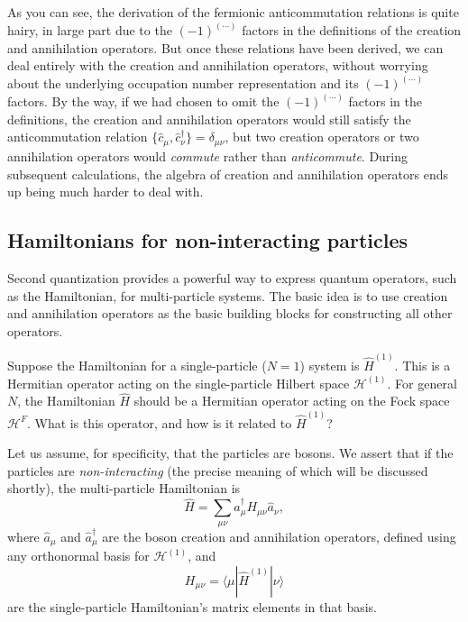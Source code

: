 \documentclass[prx,12pt]{revtex4-2}
\begin{document}
As you can see, the derivation of the fermionic anticommutation
relations is quite hairy, in large part due to the $(-1)^{(\cdots)}$
factors in the definitions of the creation and annihilation operators.
But once these relations have been derived, we can deal entirely with
the creation and annihilation operators, without worrying about the
underlying occupation number representation and its $(-1)^{(\cdots)}$
factors.  By the way, if we had chosen to omit the $(-1)^{(\cdots)}$
factors in the definitions, the creation and annihilation operators
would still satisfy the anticommutation relation
$\{\hat{c}_\mu,\hat{c}_\nu^\dagger\}=\delta_{\mu\nu}$, but two
creation operators or two annihilation operators would
\textit{commute} rather than \textit{anticommute}.  During subsequent
calculations, the algebra of creation and annihilation operators ends
up being much harder to deal with.

\subsection{Hamiltonians for non-interacting particles}
\label{sec:second_quant_op}

Second quantization provides a powerful way to express quantum
operators, such as the Hamiltonian, for multi-particle systems.  The
basic idea is to use creation and annihilation operators as the basic
building blocks for constructing all other operators.

Suppose the Hamiltonian for a single-particle ($N=1$) system is
$\hat{H}^{(1)}$.  This is a Hermitian operator acting on the
single-particle Hilbert space $\mathscr{H}^{(1)}$.  For general $N$,
the Hamiltonian $\hat{H}$ should be a Hermitian operator acting on the
Fock space $\mathscr{H}^F$.  What is this operator, and how is it
related to $\hat{H}^{(1)}$?

Let us assume, for specificity, that the particles are bosons.  We
assert that if the particles are \textit{non-interacting} (the precise
meaning of which will be discussed shortly), the multi-particle
Hamiltonian is
\begin{equation}
  \hat{H} = \sum_{\mu\nu} \hat{a}^\dagger_\mu H_{\mu\nu} \hat{a}_\nu,
  \label{twobosonH}
\end{equation}
where $\hat{a}_\mu$ and $\hat{a}_\mu^\dagger$ are the boson creation
and annihilation operators, defined using any orthonormal basis for
$\mathscr{H}^{(1)}$, and
\begin{equation}
  H_{\mu\nu} = \langle\mu|\hat{H}^{(1)}|\nu\rangle
  \label{Hmunu}
\end{equation}
are the single-particle Hamiltonian's matrix elements in that basis.
\end{document}
